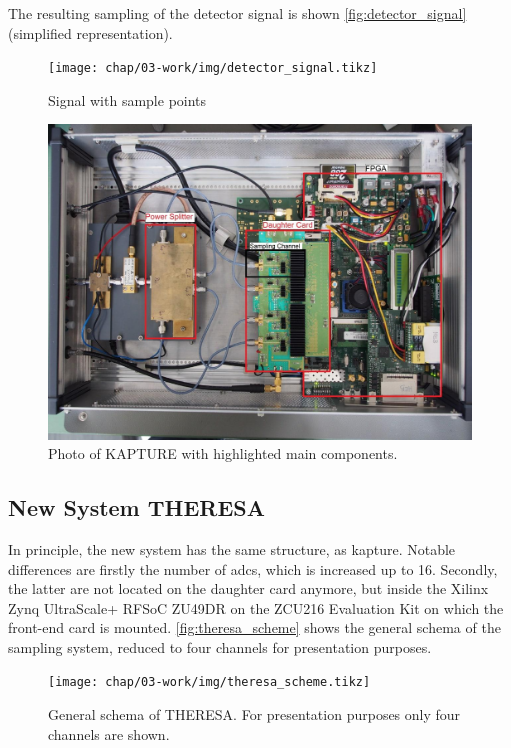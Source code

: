 The resulting sampling of the detector signal is shown \autoref{fig:detector_signal} (simplified representation).
\begin{figure}[H]
	\centering
	\texttt{[image: chap/03-work/img/detector\_signal.tikz]}
	\caption{Signal with sample points}
	\label{fig:detector_signal}
\end{figure}

\begin{figure}[H]
	\centering
	\includegraphics[width = \textwidth]{chap/03-work/img/kapture_sys}
	\caption{Photo of KAPTURE with highlighted main components. \cite[p.~61]{brosi}}
	\label{fig:kapturesys}
\end{figure}

\newpage
\subsection{New System THERESA}
In principle, the new system has the same structure, as \gls{kapture}. Notable differences are firstly the number of \glspl{adc}, which is increased up to 16. Secondly, the latter are not located on the daughter card anymore, but inside the Xilinx Zynq UltraScale+ RFSoC ZU49DR on the ZCU216 Evaluation Kit on which the front-end card is mounted.
\autoref{fig:theresa_scheme} shows the general schema of the sampling system, reduced to four channels for presentation purposes.
\begin{figure}[H]
	\centering
	\texttt{[image: chap/03-work/img/theresa\_scheme.tikz]}
	\caption{General schema of THERESA. For presentation purposes only four channels are shown.}
	\label{fig:theresa_scheme}
\end{figure}

